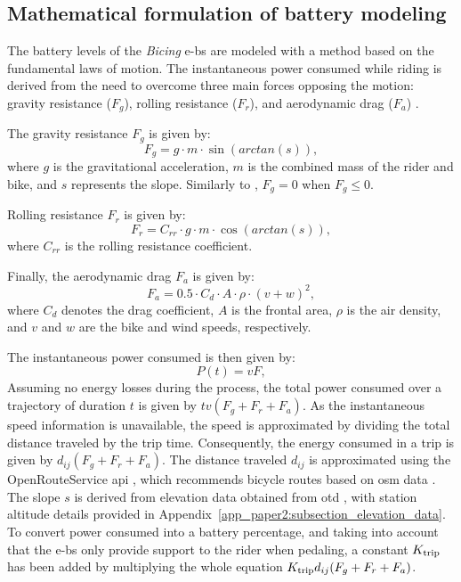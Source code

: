     \subsection{Mathematical formulation of battery modeling}
    \label{sec:battery_modeling}

      The battery levels of the \textit{Bicing} \acp{e-b} are modeled with a method based on the fundamental laws of motion. The instantaneous power consumed while riding is derived from the need to overcome three main forces opposing the motion: gravity resistance ($F_g$), rolling resistance ($F_r$), and aerodynamic drag ($F_a$) \cite{Burani2022, Steyn2014}.

      The gravity resistance $F_g$ is given by:
      \begin{equation}
      F_g=g \cdot m \cdot \sin(arctan(s)),
      \end{equation}
      where $g$ is the gravitational acceleration, $m$ is the combined mass of the rider and bike, and $s$ represents the slope. Similarly to \cite{Burani2022}, $F_g=0$ when $F_g\leq 0$.

      Rolling resistance $F_r$ is given by:
      \begin{equation}
      F_r={C_{rr}} \cdot g \cdot m  \cdot \cos(arctan(s)),
      \end{equation}
      where $C_{rr}$ is the rolling resistance coefficient.

      Finally, the aerodynamic drag $F_a$ is given by:
      \begin{equation}
      F_a=0.5 \cdot C_d \cdot A \cdot \rho \cdot (v+w)^{2},
      \end{equation}
      where $C_d$ denotes the drag coefficient, $A$ is the frontal area, $\rho$ is the air density, and $v$ and $w$ are the bike and wind speeds, respectively. 

      The instantaneous power consumed is then given by:
      \begin{equation}
      P(t)=vF,
      \end{equation}
      Assuming no energy losses during the process, the total power consumed over a trajectory of duration $t$ is given by $tv(F_g+F_r+F_a)$. As the instantaneous speed information is unavailable, the speed is approximated by dividing the total distance traveled by the trip time. Consequently, the energy consumed in a trip is given by $d_{ij}(F_g+F_r+F_a)$. The distance traveled $d_{ij}$ is approximated using the OpenRouteService \ac{api} \cite{OpenRouteService_2023}, which recommends bicycle routes based on \ac{osm} data \cite{OpenStreetMap_2023}. The slope $s$ is derived from elevation data obtained from \ac{otd} \cite{OpenTopoData_2023}, with station altitude details provided in Appendix~\ref{app_paper2:subsection_elevation_data}. To convert power consumed into a battery percentage, and taking into account that the \acp{e-b} only provide support to the rider when pedaling, a constant $K_{\rm trip}$ has been added by multiplying the whole equation $K_{\rm trip}d_{ij}(F_g+F_r+F_a)$.

